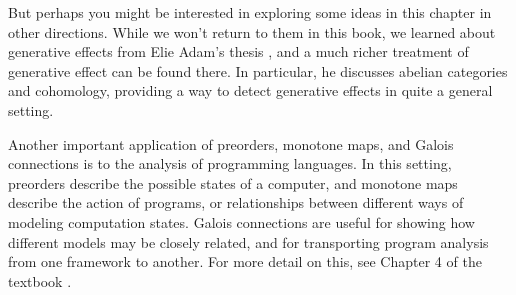 \documentclass[7Sketches]{subfiles}
\begin{document}
But perhaps you might be interested in exploring some ideas in this chapter in
other directions. While we won't return to them in this book, we learned about
generative effects from Elie Adam's thesis \cite{Adam:2017a}, and a much richer
treatment of generative effect can be found there. In particular, he discusses abelian categories and cohomology, providing a way to
detect generative effects in quite a general setting.%

Another important application of preorders, monotone maps, and Galois connections
is to the analysis of programming languages. In this setting, preorders describe
the possible states of a computer, and monotone maps describe the action of
programs, or relationships between different ways of modeling computation
states. Galois connections are useful for showing how different models may be closely
related, and for transporting program analysis from one framework to another.
For more detail on this, see Chapter 4 of the textbook
\cite{Nielson:1999:PPA:555142}.%
\end{document}
